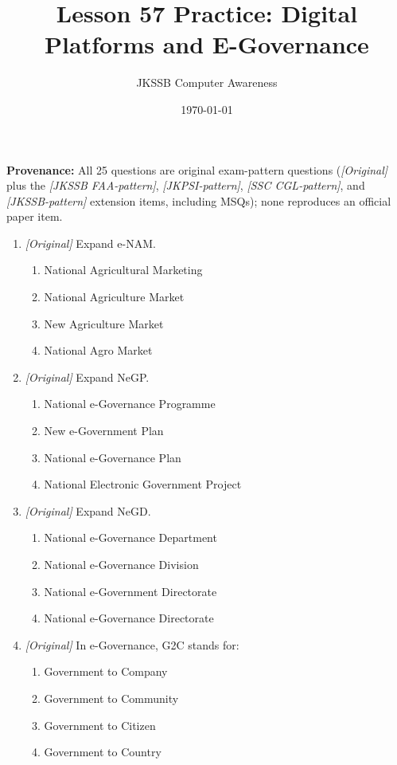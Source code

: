 \documentclass[11pt]{article}
\title{Lesson 57 Practice: Digital Platforms and E-Governance}
\author{JKSSB Computer Awareness}
\date{\today}
\begin{document}
\maketitle
\noindent\textbf{Provenance:} All 25 questions are original exam-pattern questions (\textit{[Original]} plus the \textit{[JKSSB FAA-pattern]}, \textit{[JKPSI-pattern]}, \textit{[SSC CGL-pattern]}, and \textit{[JKSSB-pattern]} extension items, including MSQs); none reproduces an official paper item.

\begin{enumerate}[label=\textbf{Q\arabic*.}, leftmargin=*]
\item \textit{[Original]} Expand e-NAM.
  \begin{enumerate}[label=\Alph*.]
    \item National Agricultural Marketing
    \item National Agriculture Market
    \item New Agriculture Market
    \item National Agro Market
  \end{enumerate}
\item \textit{[Original]} Expand NeGP.
  \begin{enumerate}[label=\Alph*.]
    \item National e-Governance Programme
    \item New e-Government Plan
    \item National e-Governance Plan
    \item National Electronic Government Project
  \end{enumerate}
\item \textit{[Original]} Expand NeGD.
  \begin{enumerate}[label=\Alph*.]
    \item National e-Governance Department
    \item National e-Governance Division
    \item National e-Government Directorate
    \item National e-Governance Directorate
  \end{enumerate}
\item \textit{[Original]} In e-Governance, G2C stands for:
  \begin{enumerate}[label=\Alph*.]
    \item Government to Company
    \item Government to Community
    \item Government to Citizen
    \item Government to Country

\end{enumerate}
\end{enumerate}
\end{document}
